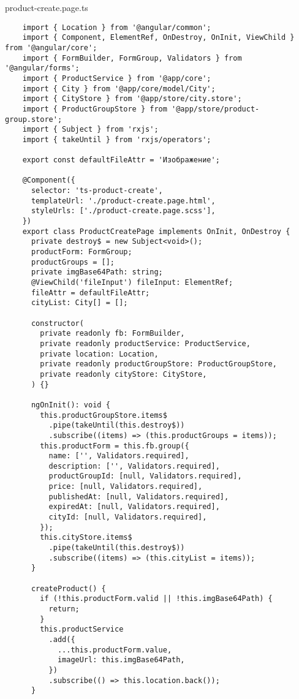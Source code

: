 product-create.page.ts
\lstset{style=ts}
\begin{lstlisting}
    import { Location } from '@angular/common';
    import { Component, ElementRef, OnDestroy, OnInit, ViewChild } from '@angular/core';
    import { FormBuilder, FormGroup, Validators } from '@angular/forms';
    import { ProductService } from '@app/core';
    import { City } from '@app/core/model/City';
    import { CityStore } from '@app/store/city.store';
    import { ProductGroupStore } from '@app/store/product-group.store';
    import { Subject } from 'rxjs';
    import { takeUntil } from 'rxjs/operators';
    
    export const defaultFileAttr = 'Изображение';
    
    @Component({
      selector: 'ts-product-create',
      templateUrl: './product-create.page.html',
      styleUrls: ['./product-create.page.scss'],
    })
    export class ProductCreatePage implements OnInit, OnDestroy {
      private destroy$ = new Subject<void>();
      productForm: FormGroup;
      productGroups = [];
      private imgBase64Path: string;
      @ViewChild('fileInput') fileInput: ElementRef;
      fileAttr = defaultFileAttr;
      cityList: City[] = [];
    
      constructor(
        private readonly fb: FormBuilder,
        private readonly productService: ProductService,
        private location: Location,
        private readonly productGroupStore: ProductGroupStore,
        private readonly cityStore: CityStore,
      ) {}
    
      ngOnInit(): void {
        this.productGroupStore.items$
          .pipe(takeUntil(this.destroy$))
          .subscribe((items) => (this.productGroups = items));
        this.productForm = this.fb.group({
          name: ['', Validators.required],
          description: ['', Validators.required],
          productGroupId: [null, Validators.required],
          price: [null, Validators.required],
          publishedAt: [null, Validators.required],
          expiredAt: [null, Validators.required],
          cityId: [null, Validators.required],
        });
        this.cityStore.items$
          .pipe(takeUntil(this.destroy$))
          .subscribe((items) => (this.cityList = items));
      }
    
      createProduct() {
        if (!this.productForm.valid || !this.imgBase64Path) {
          return;
        }
        this.productService
          .add({
            ...this.productForm.value,
            imageUrl: this.imgBase64Path,
          })
          .subscribe(() => this.location.back());
      }
    

\end{lstlisting}
